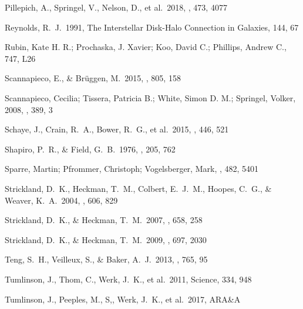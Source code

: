 \documentclass[twocolumn]{aastex62}
\begin{document}
\begin{thebibliography}{999}
 Pillepich, A., Springel, V., Nelson, D., et al.\ 2018, \mnras, 473, 4077 

 Reynolds, R.~J.\ 1991, The Interstellar Disk-Halo Connection in Galaxies, 144, 67

 Rubin, Kate H. R.; Prochaska, J. Xavier; Koo, David C.; Phillips, Andrew C., 747, L26 


 Scannapieco, E., \& Br{\"u}ggen, M.\ 2015, \apj, 805, 158

Scannapieco, Cecilia; Tissera, Patricia B.; White, Simon D. M.; Springel, Volker, 2008, \mnras, 389, 3 

 Schaye, J., Crain, R.~A., Bower, R.~G., et al.\ 2015, \mnras, 446, 521 

 Shapiro, P.~R., \& Field, G.~B.\ 1976, \apj, 205, 762 

Sparre, Martin; Pfrommer, Christoph; Vogelsberger, Mark, \mnras, 482, 5401

 Strickland, D.~K., Heckman, T.~M., Colbert, E.~J.~M., Hoopes, C.~G., \& Weaver, K.~A.\ 2004, \apj, 606, 829 

 Strickland, D.~K., \& Heckman, T.~M.\ 2007, \apj, 658, 258 

 Strickland, D.~K., \& Heckman, T.~M.\ 2009, \apj, 697, 2030 

 Teng, S.~H., Veilleux, S., \& Baker, A.~J.\ 2013, \apj, 765, 95 

 Tumlinson, J., Thom, C., Werk, J.~K., et al.\ 2011, Science, 334, 948 

 Tumlinson, J., Peeples, M., S,, Werk, J.~K., et al.\ 2017, ARA\&A


\end{thebibliography}
\end{document}
